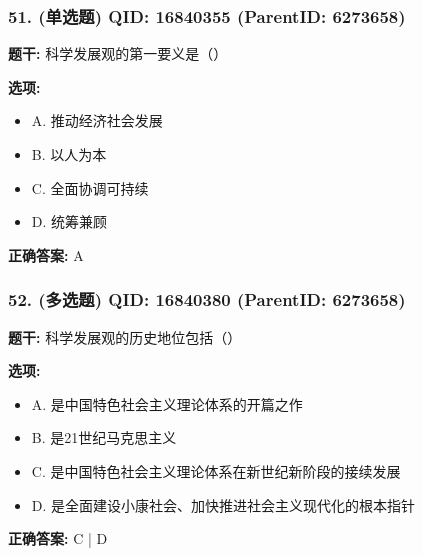\documentclass[12pt,UTF8]{ctexart}
\begin{document}
\subsubsection*{51. (单选题) \small QID: 16840355 (ParentID: 6273658)}

\textbf{题干:}
科学发展观的第一要义是（）



\textbf{选项:}
\begin{itemize}[leftmargin=*]

  \item A. 推动经济社会发展

  \item B. 以人为本

  \item C. 全面协调可持续

  \item D. 统筹兼顾

\end{itemize}

\textbf{正确答案:}
A

\vspace{0.3em}\hrulefill\vspace{0.7em}

\subsubsection*{52. (多选题) \small QID: 16840380 (ParentID: 6273658)}

\textbf{题干:}
科学发展观的历史地位包括（）



\textbf{选项:}
\begin{itemize}[leftmargin=*]

  \item A. 是中国特色社会主义理论体系的开篇之作

  \item B. 是21世纪马克思主义

  \item C. 是中国特色社会主义理论体系在新世纪新阶段的接续发展

  \item D. 是全面建设小康社会、加快推进社会主义现代化的根本指针

\end{itemize}

\textbf{正确答案:}
C | D

\vspace{0.3em}\hrulefill\vspace{0.7em}
\end{document}
